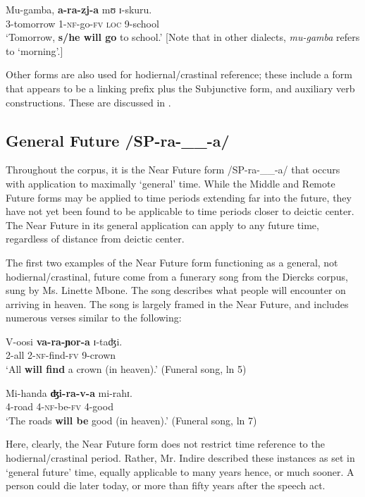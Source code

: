 \documentclass[output=paper]{langsci/langscibook}
\begin{document}
\ea\label{ex:sarvasy:1}
\gll Mu-gamba,   \textbf{a-ra-zj-a}   mʊ  ɪ-skuru. \\
3-tomorrow  1-\textsc{nf}-go-\textsc{fv}  \textsc{loc}  9-school \\
\glt ‘Tomorrow, \textbf{s/he will go} to school.’ [Note that in other dialects, \textit{mu-gamba} refers to ‘morning’.] \z

Other forms are also used for hodiernal/crastinal reference; these include a form that appears to be a linking prefix plus the Subjunctive form, and auxiliary verb constructions. These are discussed in .

\subsection{General Future /SP-ra-\_\_-a/}
\label{sec:sarvasy:3.2}

Throughout the corpus, it is the Near Future form /SP-ra-\_\_-a/ that occurs with application to maximally ‘general’ time. While the Middle and Remote Future forms may be applied to time periods extending far into the future, they have not yet been found to be applicable to time periods closer to deictic center. The Near Future in its general application can apply to any future time, regardless of distance from deictic center. 

The first two examples of the Near Future form functioning as a general, not hodiernal/crastinal, future come from a funerary song from the Diercks corpus, sung by Ms. Linette Mbone. The song describes what people will encounter on arriving in heaven. The song is largely framed in the Near Future, and includes numerous verses similar to the following:

\ea\label{ex:sarvasy:2}
\gll V-oosi   \textbf{va-ra-ɲor-a}     ɪ-taʤi. \\
2-all 2-\textsc{nf}-find-\textsc{fv}    9-crown \\
\glt ‘All \textbf{will find} a crown (in heaven).’ (Funeral song, ln 5)
\z

\ea\label{ex:sarvasy:3}
\gll Mi-handa   \textbf{ʤi-ra-v-a}   mi-rahɪ. \\
4-road 4-\textsc{nf}-be-\textsc{fv} 4-good \\
\glt ‘The roads \textbf{will be} good (in heaven).’ (Funeral song, ln 7)
\z

Here, clearly, the Near Future form does not restrict time reference to the hodiernal/crastinal period. Rather, Mr. Indire described these instances as set in ‘general future’ time, equally applicable to many years hence, or much sooner. A person could die later today, or more than fifty years after the speech act.
\end{document}
